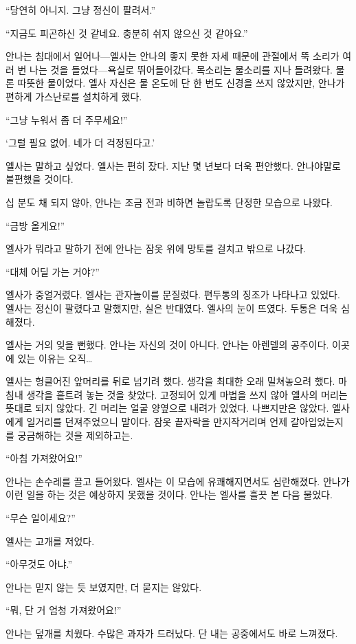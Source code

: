 ``당연히 아니지. 그냥 정신이 팔려서.''

``지금도 피곤하신 것 같네요. 충분히 쉬지 않으신 것 같아요.''

안나는 침대에서 일어나—엘사는 안나의 좋지 못한 자세 때문에 관절에서 뚝 소리가 여러 번 나는 것을 들었다—욕실로 뛰어들어갔다. 목소리는 물소리를 지나 들려왔다. 물론 따뜻한 물이었다. 엘사 자신은 물 온도에 단 한 번도 신경을 쓰지 않았지만, 안나가 편하게 가스난로를 설치하게 했다.

``그냥 누워서 좀 더 주무세요!''

`그럴 필요 없어. 네가 더 걱정된다고.'

엘사는 말하고 싶었다. 엘사는 편히 잤다. 지난 몇 년보다 더욱 편안했다. 안나야말로 불편했을 것이다.

십 분도 채 되지 않아, 안나는 조금 전과 비하면 놀랍도록 단정한 모습으로 나왔다.

``금방 올게요!''

엘사가 뭐라고 말하기 전에 안나는 잠옷 위에 망토를 걸치고 밖으로 나갔다.

``대체 어딜 가는 거야?''

엘사가 중얼거렸다. 엘사는 관자놀이를 문질렀다. 편두통의 징조가 나타나고 있었다. 엘사는 정신이 팔렸다고 말했지만, 실은 반대였다. 엘사의 눈이 뜨였다. 두통은 더욱 심해졌다.

엘사는 거의 잊을 뻔했다. 안나는 자신의 것이 아니다. 안나는 아렌델의 공주이다. 이곳에 있는 이유는 오직\ldots

엘사는 헝클어진 앞머리를 뒤로 넘기려 했다. 생각을 최대한 오래 밀쳐놓으려 했다. 마침내 생각을 흩트려 놓는 것을 찾았다. 고정되어 있게 마법을 쓰지 않아 엘사의 머리는 뜻대로 되지 않았다. 긴 머리는 얼굴 양옆으로 내려가 있었다. 나쁘지만은 않았다. 엘사에게 일거리를 던져주었으니 말이다. 잠옷 끝자락을 만지작거리며 언제 갈아입었는지를 궁금해하는 것을 제외하고는.

``아침 가져왔어요!''

안나는 손수레를 끌고 들어왔다. 엘사는 이 모습에 유쾌해지면서도 심란해졌다. 안나가 이런 일을 하는 것은 예상하지 못했을 것이다. 안나는 엘사를 흘끗 본 다음 물었다.

``무슨 일이세요?''

엘사는 고개를 저었다.

``아무것도 아냐.''

안나는 믿지 않는 듯 보였지만, 더 묻지는 않았다.

``뭐, 단 거 엄청 가져왔어요!''

안나는 덮개를 치웠다. 수많은 과자가 드러났다. 단 내는 공중에서도 바로 느껴졌다.

